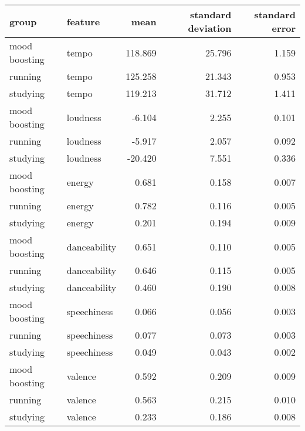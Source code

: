 \begin{tabular}{llrrr}
\toprule
        group &      feature &    mean &  standard deviation &  standard error \\
\midrule
mood boosting &        tempo & 118.869 &              25.796 &           1.159 \\
      running &        tempo & 125.258 &              21.343 &           0.953 \\
     studying &        tempo & 119.213 &              31.712 &           1.411 \\
mood boosting &     loudness &  -6.104 &               2.255 &           0.101 \\
      running &     loudness &  -5.917 &               2.057 &           0.092 \\
     studying &     loudness & -20.420 &               7.551 &           0.336 \\
mood boosting &       energy &   0.681 &               0.158 &           0.007 \\
      running &       energy &   0.782 &               0.116 &           0.005 \\
     studying &       energy &   0.201 &               0.194 &           0.009 \\
mood boosting & danceability &   0.651 &               0.110 &           0.005 \\
      running & danceability &   0.646 &               0.115 &           0.005 \\
     studying & danceability &   0.460 &               0.190 &           0.008 \\
mood boosting &  speechiness &   0.066 &               0.056 &           0.003 \\
      running &  speechiness &   0.077 &               0.073 &           0.003 \\
     studying &  speechiness &   0.049 &               0.043 &           0.002 \\
mood boosting &      valence &   0.592 &               0.209 &           0.009 \\
      running &      valence &   0.563 &               0.215 &           0.010 \\
     studying &      valence &   0.233 &               0.186 &           0.008 \\
\bottomrule
\end{tabular}
